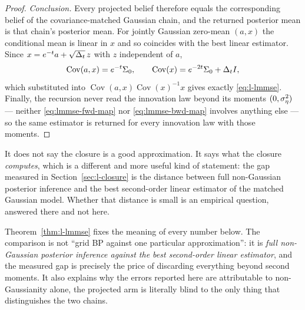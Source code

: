 \begin{proof}
\emph{Conclusion.} Every projected belief therefore equals the corresponding
belief of the covariance-matched Gaussian chain, and the returned posterior
mean is that chain's posterior mean. For jointly Gaussian zero-mean $(a, x)$
the conditional mean is linear in $x$ and so coincides with the best linear
estimator. Since $x = e^{-t} a + \sqrt{\Delta_t}\, z$ with $z$ independent of
$a$,
\begin{equation}
  \operatorname{Cov}(a, x) = e^{-t} \Sigma_0,
  \qquad
  \operatorname{Cov}(x) = e^{-2t} \Sigma_0 + \Delta_t I,
  \label{eq:lmmse-covs}
\end{equation}
which substituted into
$\operatorname{Cov}(a,x)\operatorname{Cov}(x)^{-1}x$ gives exactly
\eqref{eq:l-lmmse}. Finally, the recursion never read the innovation law
beyond its moments $(0, \sigma_\eta^2)$ --- neither \eqref{eq:lmmse-fwd-map} nor
\eqref{eq:lmmse-bwd-map} involves anything else --- so the same estimator is
returned for every innovation law with those moments.
\end{proof}

\begin{remark}
It does not say the closure is a good approximation. It says what the closure
\emph{computes}, which is a different and more useful kind of statement: the
gap measured in Section~\ref{sec:l-closure} is the distance between
full non-Gaussian posterior inference and the best second-order linear
estimator of the matched Gaussian model. Whether that distance is small is an
empirical question, answered there and not here.
\end{remark}


Theorem~\ref{thm:l-lmmse} fixes the meaning of every number below. The
comparison is not ``grid BP against one particular approximation'': it is
\emph{full non-Gaussian posterior inference against the best second-order
linear estimator}, and the measured gap is precisely the price of discarding
everything beyond second moments. It also explains why the errors reported
here are attributable to non-Gaussianity alone, the projected arm is
literally blind to the only thing that distinguishes the two chains.

